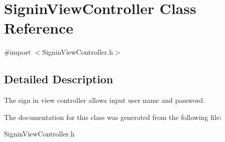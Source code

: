 \hypertarget{interface_signin_view_controller}{\section{\-Signin\-View\-Controller \-Class \-Reference}
\label{interface_signin_view_controller}
}


{\ttfamily \#import $<$\-Signin\-View\-Controller.\-h$>$}



\subsection{\-Detailed \-Description}
\-The sign in view controller allows input user name and password. 

\-The documentation for this class was generated from the following file\-:\begin{DoxyCompactItemize}
\item 
\-Signin\-View\-Controller.\-h\end{DoxyCompactItemize}
